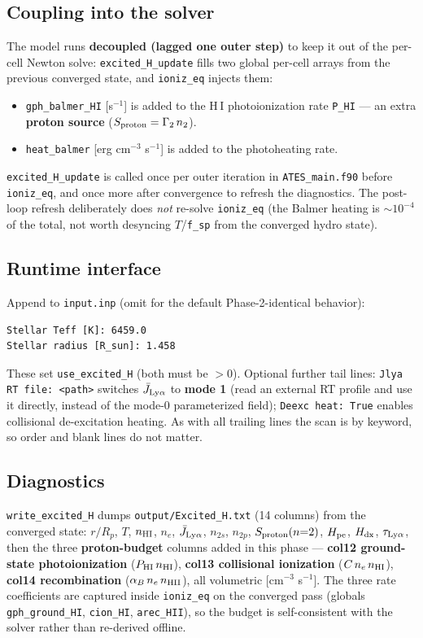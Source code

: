 \documentclass[english,a4paper]{kiseon_memo}
\begin{document}
\subsection{Coupling into the solver}

The model runs \textbf{decoupled (lagged one outer step)} to keep it out of the
per-cell Newton solve: \verb|excited_H_update| fills two global per-cell arrays
from the previous converged state, and \verb|ioniz_eq| injects them:
\begin{itemize}
  \item \verb|gph_balmer_HI| [s\(^{-1}\)] is added to the H\,I photoionization rate
    \verb|P_HI| --- an extra \textbf{proton source}
    (\(S_{\rm proton}=\Gamma_2\,n_2\)).
  \item \verb|heat_balmer| [erg cm\(^{-3}\) s\(^{-1}\)] is added to the photoheating
    rate.
\end{itemize}
\verb|excited_H_update| is called once per outer iteration in
\texttt{ATES\_main.f90} before \verb|ioniz_eq|, and once more after convergence to
refresh the diagnostics. The post-loop refresh deliberately does \emph{not}
re-solve \verb|ioniz_eq| (the Balmer heating is \(\sim10^{-4}\) of the total, not
worth desyncing \(T\)/\verb|f_sp| from the converged hydro state).

\subsection{Runtime interface}

Append to \texttt{input.inp} (omit for the default Phase-2-identical behavior):
\begin{verbatim}
Stellar Teff [K]: 6459.0
Stellar radius [R_sun]: 1.458
\end{verbatim}
These set \verb|use_excited_H| (both must be \(>0\)). Optional further tail lines:
\verb|Jlya RT file: <path>| switches \(\bar J_{{\rm Ly}\alpha}\) to \textbf{mode 1}
(read an external RT profile and use it directly, instead of the mode-0
parameterized field); \verb|Deexc heat: True| enables collisional de-excitation
heating. As with all trailing lines the scan is by keyword, so order and blank
lines do not matter.

\subsection{Diagnostics}

\verb|write_excited_H| dumps \texttt{output/Excited\_H.txt} (14 columns) from the
converged state: \(r/R_p\), \(T\), \(n_{\rm HI}\), \(n_e\),
\(\bar J_{{\rm Ly}\alpha}\), \(n_{2s}\), \(n_{2p}\), \(S_{\rm proton}(n{=}2)\),
\(H_{\rm pe}\), \(H_{\rm dx}\), \(\tau_{{\rm Ly}\alpha}\),
then the three \textbf{proton-budget} columns added in this phase ---
\textbf{col12 ground-state photoionization} (\(P_{\rm HI}\,n_{\rm HI}\)),
\textbf{col13 collisional ionization} (\(C\,n_e\,n_{\rm HI}\)),
\textbf{col14 recombination} (\(\alpha_B\,n_e\,n_{\rm HII}\)), all volumetric
[cm\(^{-3}\) s\(^{-1}\)]. The three rate coefficients are captured inside
\verb|ioniz_eq| on the converged pass (globals \verb|gph_ground_HI|,
\verb|cion_HI|, \verb|arec_HII|), so the budget is self-consistent with the solver
rather than re-derived offline.
\end{document}
